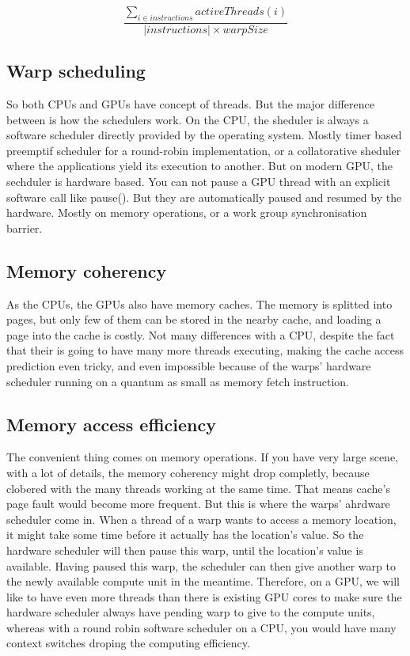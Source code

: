 \[\frac{\sum_{i \in instructions}activeThreads(i)}{| instructions | \times warpSize}\]

\subsection{Warp scheduling}
So both CPUs and GPUs have concept of threads. But the major difference between is
how the schedulers work. On the CPU, the sheduler is always a software scheduler
directly provided by the operating system. Mostly timer based preemptif
scheduler for a round-robin implementation, or a collatorative
sheduler where the applications yield its execution to another. But on modern GPU,
the sechduler is hardware based. You can not pause a GPU thread with an explicit
software call like pause().
But they are automatically paused and resumed by the hardware. Mostly on memory
operations, or a work group synchronisation barrier.

\subsection{Memory coherency}
As the CPUs, the GPUs also have memory caches. The memory is splitted into pages,
but only few of them can be stored in the nearby cache, and loading a page into
the cache is costly. Not many differences with a CPU, despite the fact that
their is going to have many more threads executing, making the cache access prediction
even tricky, and even impossible because of the warps' hardware scheduler running
on a quantum as small as memory fetch instruction.

\subsection{Memory access efficiency}
The convenient thing comes on memory operations. If you have very large scene, with a
lot of details, the memory coherency might drop completly, because clobered with
the many threads working at the same time. That means cache's page fault would become more frequent.
But this is where the warps' ahrdware scheduler come in. When a thread of a
warp wants to access a memory
location, it might take some time before it actually has the location's value.
So the hardware scheduler will then pause this warp, until the location's value
is available. Having paused this warp, the scheduler can then give another
warp to the newly available compute unit in the meantime. Therefore, on a GPU, we will
like to have even more threads than there is existing GPU cores to make sure the
hardware scheduler always have pending warp to give to the compute units, whereas
with a round robin software scheduler on a CPU, you would have many context
switches droping the computing efficiency.
